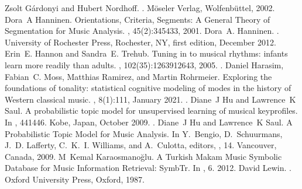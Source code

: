 \documentclass[letterpaper,10pt,english]{sphinxmanual}
\begin{document}
\begin{sphinxthebibliography}{10}
\sphinxAtStartPar
Zsolt Gárdonyi and Hubert Nordhoff. . Möseler Verlag, Wolfenbüttel, 2002.
\sphinxAtStartPar
Dora A Hanninen. Orientations, Criteria, Segments: A General Theory of Segmentation for Music Analysis. , 45(2):345\textendash{}433, 2001.
\sphinxAtStartPar
Dora A. Hanninen. . University of Rochester Press, Rochester, NY, first edition, December 2012.
\sphinxAtStartPar
Erin E. Hannon and Sandra E. Trehub. Tuning in to musical rhythms: infants learn more readily than adults. , 102(35):12639\textendash{}12643, 2005. .
\sphinxAtStartPar
Daniel Harasim, Fabian C. Moss, Matthias Ramirez, and Martin Rohrmeier. Exploring the foundations of tonality: statistical cognitive modeling of modes in the history of Western classical music. , 8(1):1\textendash{}11, January 2021. .
\sphinxAtStartPar
Diane J Hu and Lawrence K Saul. A probabilistic topic model for unsupervised learning of musical key\sphinxhyphen{}profiles. In , 441\textendash{}446. Kobe, Japan, October 2009. .
\sphinxAtStartPar
Diane J Hu and Lawrence K Saul. A Probabilistic Topic Model for Music Analysis. In Y. Bengio, D. Schuurmans, J. D. Lafferty, C. K. I. Williams, and A. Culotta, editors, , 1\textendash{}4. Vancouver, Canada, 2009.
\sphinxAtStartPar
M Kemal Karaosmanoğlu. A Turkish Makam Music Symbolic Database for Music Information Retrieval: SymbTr. In , 6. 2012.
\sphinxAtStartPar
David Lewin. . Oxford University Press, Oxford, 1987.

\end{sphinxthebibliography}
\end{document}
